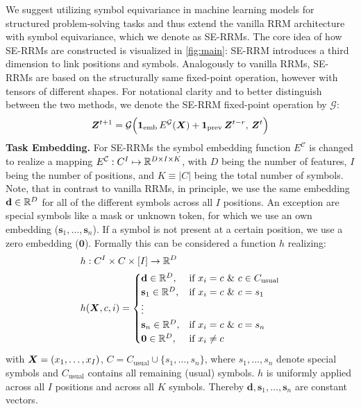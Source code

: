 \documentclass{article}
\theoremstyle{plain}
\theoremstyle{definition}
\theoremstyle{remark}
\renewcommand{\paragraph}[1]{\textbf{#1}\;}
\begin{document}
We suggest utilizing symbol equivariance in machine learning models for structured problem-solving tasks and thus extend the vanilla RRM architecture with symbol equivariance, which we denote as SE-RRMs. The core idea of how SE-RRMs are constructed is visualized in \cref{fig:main}: SE-RRM introduces a third dimension to link positions and symbols. Analogously to vanilla RRMs, SE-RRMs are based on the structurally same fixed-point operation, however with tensors of different shapes. For notational clarity and to better distinguish between the two methods, we denote the SE-RRM fixed-point operation by $\mathcal G$:
\begin{align}
\bm{Z}^{t+1} = \mathcal G\Big(\mathbf{1}_{\text{emb}}\, E^{\mathcal G}(\bm{X}) + \mathbf{1}_{\text{prev}}\, \bm{Z}^{t-r}, \, \bm{Z}^t\Big)
\end{align}
%
\paragraph{Task Embedding.} For SE-RRMs the symbol embedding function $E^{\mathcal C}$ is changed to realize a mapping $E^{\mathcal C}: C^I \mapsto \mathbb{R}^{D \times I \times K }$, with $D$ being the number of features, $I$ being the number of positions, and $K\equiv|C|$ being the total number of symbols. Note, that in contrast to vanilla RRMs, in principle, we use the same embedding $\mathbf{d} \in \mathbb{R}^D$ for all of the different symbols across all $I$ positions. An exception are special symbols like a mask or unknown token, for which we use an own embedding ($\mathbf{s}_1,\ldots,\mathbf{s}_n$). If a symbol is not present at a certain position, we use a zero embedding ($\mathbf{0}$). Formally this can be considered a function $h$ realizing:
\begin{align*}
&h : C^I \times C \times [I] \rightarrow \mathbb{R}^D\\
&h(\bm{X}, c, i) =
\begin{cases}
\mathbf{d} \in \mathbb{R}^D, & \text{if } x_i=c\,\,\&\,\,c \in C_\text{usual} \\
\mathbf{s}_1 \in \mathbb{R}^D, & \text{if } x_i=c\,\,\&\,\,c=s_1 \\
\vdots  & \\
\mathbf{s}_n \in \mathbb{R}^D,    & \text{if } x_i=c\,\,\&\,\,c=s_n \\
\mathbf{0} \in \mathbb{R}^D,    & \text{if } x_i\neq c \\
\end{cases}
\end{align*}
with $\bm{X} = (x_1, \ldots, x_I)$, \( C = C_{\text{usual}} \cup \{ s_1, \ldots, s_n \} \), where \( s_1, \ldots, s_n \) denote special symbols and \( C_{\text{usual}} \) contains all remaining (usual) symbols.
  $h$ is uniformly applied across all $I$ positions and across all $K$ symbols. Thereby $\mathbf{d}, \mathbf{s}_1, \ldots, \mathbf{s}_n$ are constant vectors.
\end{document}
